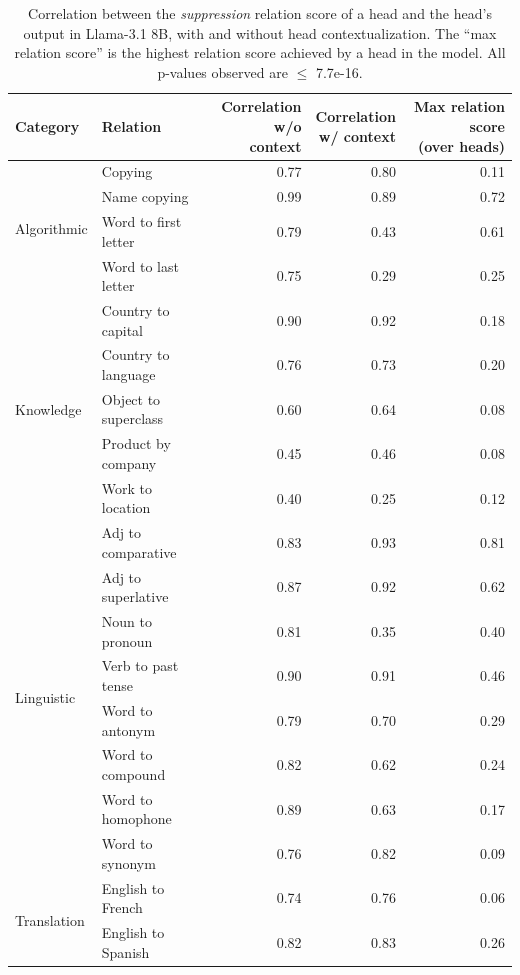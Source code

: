 \documentclass[11pt]{article}
\newcommand{\llamaThreeEightB}{Llama-3.1 8B}
\begin{document}
\begin{table}[p]
\centering
\footnotesize

\begin{tabular}{llrrr}
\toprule
Category & Relation & \makecell{Correlation\\w/o context} & \makecell{Correlation\\w/ context} & \makecell{Max relation score\\(over heads)} \\
\midrule
\multirow{4}{*}{Algorithmic} & Copying & 0.77 & 0.80 & 0.11 \\
 & Name copying & 0.99 & 0.89 & 0.72 \\
 & Word to first letter & 0.79 & 0.43 & 0.61 \\
 & Word to last letter & 0.75 & 0.29 & 0.25 \\
\midrule
\multirow{5}{*}{Knowledge} & Country to capital & 0.90 & 0.92 & 0.18 \\
 & Country to language & 0.76 & 0.73 & 0.20 \\
 & Object to superclass & 0.60 & 0.64 & 0.08 \\
 & Product by company & 0.45 & 0.46 & 0.08 \\
 & Work to location & 0.40 & 0.25 & 0.12 \\
\midrule
\multirow{8}{*}{Linguistic} & Adj to comparative & 0.83 & 0.93 & 0.81 \\
 & Adj to superlative & 0.87 & 0.92 & 0.62 \\
 & Noun to pronoun & 0.81 & 0.35 & 0.40 \\
 & Verb to past tense & 0.90 & 0.91 & 0.46 \\
 & Word to antonym & 0.79 & 0.70 & 0.29 \\
 & Word to compound & 0.82 & 0.62 & 0.24 \\
 & Word to homophone & 0.89 & 0.63 & 0.17 \\
 & Word to synonym & 0.76 & 0.82 & 0.09 \\
\midrule
\multirow{2}{*}{Translation} & English to French & 0.74 & 0.76 & 0.06 \\
 & English to Spanish & 0.82 & 0.83 & 0.26 \\
\bottomrule
\end{tabular}


\caption{Correlation between the \emph{suppression} relation score of a head and the head's output in \llamaThreeEightB{}, with and without head contextualization. The ``max relation score'' is the highest relation score achieved by a head in the model. All p-values observed are $\leq$ 7.7e-16.} 
\label{tab:Dynamic_results_llama_8b_supression}
\end{table}
\end{document}
